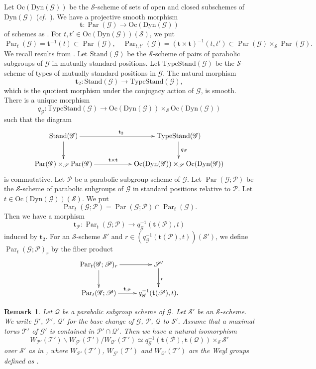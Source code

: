\documentclass[12pt,a4paper]{article}
\newtheorem{rem}[thm]{Remark}
\DeclareMathOperator{\Par}{Par}
\newcommand{\bft}{\mathbf{t}}
\newcommand{\sG}{\mathscr{G}}
\newcommand{\sP}{\mathscr{P}}
\newcommand{\sQ}{\mathscr{Q}}
\newcommand{\sS}{\mathscr{S}}
\newcommand{\sT}{\mathscr{T}}
\newcommand{\cf}{\textit{cf.\ }}
\begin{document}
Let $\mathrm{Oc}(\mathrm{Dyn}(\sG))$ be the $\sS$-scheme of 
sets of open and closed subschemes of 
$\mathrm{Dyn}(\sG)$ (\cf \cite[XXVI, 3.1]{SGA3-3}). 
We have a projective smooth morphism 
\[
 \mathbf{t} \colon \Par (\sG) \to \mathrm{Oc}(\mathrm{Dyn}(\sG)) 
\]
of schemes as \cite[XXVI, Th\'eor\`eme 3.3]{SGA3-3}. For $t,t' \in \mathrm{Oc}(\mathrm{Dyn}(\sG))(\sS)$, we put 
\[
 \Par_{t} (\sG) =\bft^{-1} (t) \subset \Par (\sG), \quad  
 \Par_{t,t'} (\sG) =(\bft \times \bft)^{-1} (t,t') \subset \Par (\sG) \times_{\sS} \Par (\sG). 
\]
We recall results from \cite[XXVI. 4.5.3, 4.5.4]{SGA3-3}. 
Let $\mathrm{Stand}(\sG)$ be the 
$\sS$-scheme of pairs of parabolic subgroups of $\sG$ in mutually standard positions. 
Let $\mathrm{TypeStand}(\sG)$ be the $\sS$-scheme of types of mutually standard positions in $\sG$. 
The natural morphism 
\[
 \mathbf{t}_2 \colon \mathrm{Stand}(\sG) \to  \mathrm{TypeStand}(\sG), 
\] 
which is the quotient morphism under the conjugacy action of $\sG$, is smooth. 
There is a unique morphism 
\[
 q_{\sG} \colon \mathrm{TypeStand}(\sG) \to \mathrm{Oc}(\mathrm{Dyn}(\sG)) \times_{\sS} \mathrm{Oc}(\mathrm{Dyn}(\sG)) 
\]
such that the diagram 
\[
 \xymatrix{
  \mathrm{Stand}(\sG)  \ar[rr]^{\mathbf{t}_2}  \ar[d] &     &   \mathrm{TypeStand}(\sG)         \ar[d]^{q_{\sG}} \\ 
  \Par (\sG) \times_{\sS} \Par (\sG)   \ar[rr]^-{\mathbf{t} \times \mathbf{t}}   &  &  \mathrm{Oc}(\mathrm{Dyn}(\sG)) \times_{\sS} \mathrm{Oc}(\mathrm{Dyn}(\sG))} 
\]
is commutative. 
Let $\sP$ be a parabolic subgroup scheme of $\sG$. 
Let $\Par (\sG; \sP)$ be the $\sS$-scheme of parabolic subgroups of $\sG$ in standard positions relative to $\sP$. 
Let $t \in \mathrm{Oc}(\mathrm{Dyn}(\sG))(\sS)$. 
We put 
\[
 \Par_t (\sG;\sP)=\Par (\sG;\sP) \cap \Par_t (\sG). 
\]
Then we have a morphism 
\[
 \mathbf{t}_{\sP} \colon \Par_t (\sG;\sP) \to q_{\sG}^{-1}(\mathbf{t}(\sP),t)  
\]
induced by $\bft_2$. 
For an $\sS$-scheme $\sS'$ and 
$r \in (q_{\sG}^{-1}(\mathbf{t}(\sP),t))(\sS')$, 
we define $\Par_t (\sG;\sP)_r$ by the fiber product 
\[
 \xymatrix{
 \Par_t (\sG;\sP)_r   \ar[r] \ar[d]     &   \sS'         \ar[d]^{r} \\ 
  \Par_t (\sG;\sP)  \ar[r]^-{\mathbf{t}_{\sP}}   &  q_{\sG}^{-1}(\mathbf{t}(\sP),t) .} 
\]
\begin{rem}
Let $\sQ$ be a parabolic subgroup scheme of $\sG$. 
Let $\sS'$ be an $\sS$-scheme. 
We write $\sG'$, $\sP'$, $\sQ'$ for the base change of $\sG$, $\sP$, $\sQ$ to $\sS'$. 
Assume that a maximal torus 
$\sT'$ of $\sG'$ is contained in $\sP' \cap \sQ'$. 
Then we have a natural isomorphism 
\begin{equation}\label{eq:WTS}
 W_{\sP'}(\sT') \backslash W_{\sG'}(\sT') / W_{\sQ'}(\sT') 
 \simeq q_{\sG}^{-1}(\mathbf{t}(\sP),\mathbf{t}(\sQ)) \times_{\sS} \sS' 
\end{equation}
over $\sS'$ as in \cite[XXVI. 4.5.3]{SGA3-3}, 
where $W_{\sP'}(\sT')$, $W_{\sG'}(\sT')$ and $W_{\sQ'}(\sT')$ are the Weyl groups defined as \cite[XII, 2]{SGA3-2}. 
\end{rem}
\end{document}
